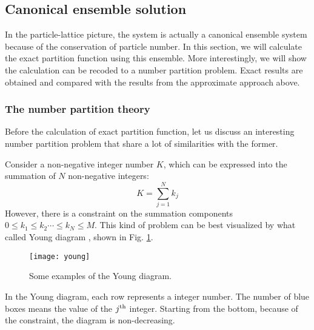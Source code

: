 \subsection{Canonical ensemble solution}
\label{sub:canonical_ensemble_solution}
In the particle-lattice picture, the system is actually a canonical ensemble system because of the conservation of particle number. In this section, we will calculate the exact partition function using this ensemble. More interestingly, we will show the calculation can be recoded to a number partition problem. Exact results are obtained and compared with the results from the approximate approach above.

\subsubsection{The number partition theory}
\label{ssub:The Number Partition Theory}
Before the calculation of exact partition function, let us discuss an interesting number partition problem that share a lot of similarities with the former. 

Consider a non-negative integer number $K$, which can be expressed into the summation of $N$ non-negative integers:
\begin{equation}
    K = \sum_{j=1}^N k_j
\end{equation}
However, there is a constraint on the summation components $0 \leqslant k_1 \leqslant k_2 \cdots \leqslant k_N \leqslant M$. This kind of problem can be best visualized by what called Young diagram \cite{Andrews1998}, shown in Fig. \ref{fig:young}.
\begin{figure}[htpb]
    \centering
    \texttt{[image: young]}
    \caption{Some examples of the Young diagram.}
    \label{fig:young}
\end{figure}
In the Young diagram, each row represents a integer number. The number of blue boxes means the value of the $j^{\rm{th}}$ integer. Starting from the bottom, because of the constraint, the diagram is non-decreasing. 

